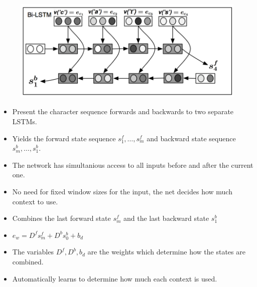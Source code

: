 \documentclass[11pt, a4paper, landscape]{article}
\begin{document}
\vfill
\begin{figure}[H]
\begin{center}
  \includegraphics[width=.5\linewidth]{../article/img/brnn-unfolded}
\end{center}
\end{figure}
\begin{itemize}
\item Present the character sequence forwards and backwards to two separate LSTMs.
\item Yields the forward state sequence $s_{1}^f, \dots, s_{m}^f$ and backward state sequence $s_{m}^b, \dots, s_{1}^b$.
\item The network has simultanious access to all inputs before and after the current one.
\item No need for fixed window sizes for the input, the net decides how much context to use.
\end{itemize}
\vfill


\NewPage{}

\vfill
\begin{itemize}
\item Combines the last forward state $s_{m}^f$ and the last backward state $s_{1}^b$
\item $e_{w} = D^f s_{m}^f + D^b s_{0}^b + b_d$
\item The variables $D^f, D^b, b_d$ are the weights which determine how the states are combined.
\item Automatically learns to determine how much each context is used.
\end{itemize}
\vfill


\NewPage{}
\end{document}

